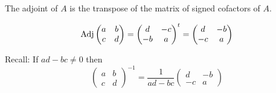 \documentclass[10pt, a4paper]{article}
\begin{document}
The adjoint of $A$ is the transpose of the matrix of signed cofactors of $A$.
\begin{example}
    \[
    \operatorname{Adj}\begin{pmatrix}
        a & b \\ c & d
    \end{pmatrix} = \begin{pmatrix}
        d & -c \\ -b & a
    \end{pmatrix} ^ t
    =
    \begin{pmatrix}
        d & -b \\ -c & a
    \end{pmatrix}
    \]
\end{example}
Recall:
If $ad - bc \neq 0$ then
\[
\begin{pmatrix}
    a & b \\ c & d
\end{pmatrix} ^ {-1}
=
\frac{1}{ad - bc}\begin{pmatrix}
    d & -b \\ -c & a
\end{pmatrix}
\]
\end{document}
